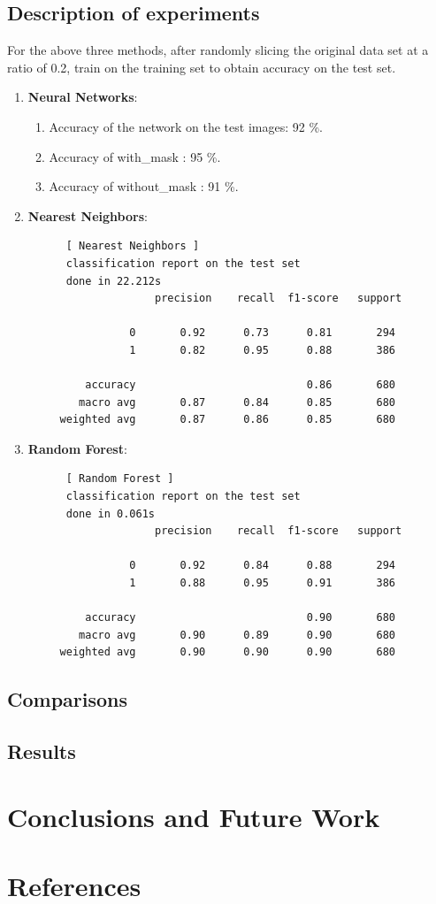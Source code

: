 \documentclass{article}
\begin{document}
  \subsection{Description of experiments}
  For the above three methods, after randomly slicing the original data set at a ratio of 0.2, train on the training set to obtain accuracy on the test set.
  \begin{enumerate}
    \item \textbf{Neural Networks}:
          \begin{enumerate}
            \item Accuracy of the network on the test images: 92 \%.
            \item Accuracy of with\_mask : 95 \%.
            \item Accuracy of without\_mask : 91 \%.
          \end{enumerate}
    \item \textbf{Nearest Neighbors}:\begin{lstlisting}
      [ Nearest Neighbors ]
      classification report on the test set
      done in 22.212s
                    precision    recall  f1-score   support

                0       0.92      0.73      0.81       294
                1       0.82      0.95      0.88       386

         accuracy                           0.86       680
        macro avg       0.87      0.84      0.85       680
     weighted avg       0.87      0.86      0.85       680
    \end{lstlisting}
    \item \textbf{Random Forest}:\begin{lstlisting}
      [ Random Forest ]
      classification report on the test set
      done in 0.061s
                    precision    recall  f1-score   support

                0       0.92      0.84      0.88       294
                1       0.88      0.95      0.91       386

         accuracy                           0.90       680
        macro avg       0.90      0.89      0.90       680
     weighted avg       0.90      0.90      0.90       680
    \end{lstlisting}

  \end{enumerate}
  \subsection{Comparisons}

  \subsection{Results}


\section{Conclusions and Future Work}

\section{References}
\end{document}
